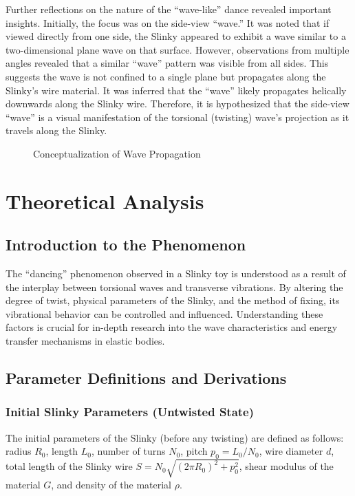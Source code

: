 \documentclass{mcmthesis}  %
\begin{document}
Further reflections on the nature of the ``wave-like'' dance revealed important insights. Initially, the focus was on the side-view ``wave.'' It was noted that if viewed directly from one side, the Slinky appeared to exhibit a wave similar to a two-dimensional plane wave on that surface. However, observations from multiple angles revealed that a similar ``wave'' pattern was visible from all sides. This suggests the wave is not confined to a single plane but propagates along the Slinky's wire material. It was inferred that the ``wave'' likely propagates helically downwards along the Slinky wire. Therefore, it is hypothesized that the side-view ``wave'' is a visual manifestation of the torsional (twisting) wave's projection as it travels along the Slinky.

\begin{figure}[h!]
    \centering
    \caption{Conceptualization of Wave Propagation}
    \label{fig:wave_reflection}
\end{figure}

\section{Theoretical Analysis} %

\subsection{Introduction to the Phenomenon}
The ``dancing'' phenomenon observed in a Slinky toy is understood as a result of the interplay between torsional waves and transverse vibrations. By altering the degree of twist, physical parameters of the Slinky, and the method of fixing, its vibrational behavior can be controlled and influenced. Understanding these factors is crucial for in-depth research into the wave characteristics and energy transfer mechanisms in elastic bodies.

\subsection{Parameter Definitions and Derivations}

\subsubsection{Initial Slinky Parameters (Untwisted State)}
The initial parameters of the Slinky (before any twisting) are defined as follows: radius $R_0$, length $L_0$, number of turns $N_0$, pitch $p_0 = L_0 / N_0$, wire diameter $d$, total length of the Slinky wire $S = N_0 \sqrt{(2\pi R_0)^2 + p_0^2}$, shear modulus of the material $G$, and density of the material $\rho$.
\end{document}
